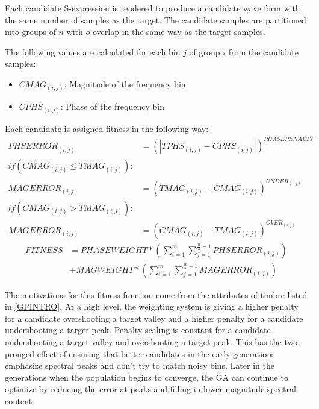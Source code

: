 \documentclass[12pt]{article}
\begin{document}
Each candidate S-expression is rendered to produce a candidate wave form with the same number of samples as the target. The candidate samples are partitioned into groups of $n$ with $o$ overlap in the same way as the target samples.

The following values are calculated for each bin $j$ of group $i$ from the candidate samples:
\begin{itemize}
\addtolength{\itemindent}{1cm}
\vspace{-3mm} 
\item $CMAG_{(i, j)}$: Magnitude of the frequency bin
\vspace{-3mm} 
\item $CPHS_{(i, j)}$: Phase of the frequency bin
\vspace{-2mm}
\end{itemize}

Each candidate is assigned fitness in the following way:
\vspace{-2mm} 
\begin{align*}
PHSERROR_{(i, j)} &= (|TPHS_{(i, j)} - CPHS_{(i, j)}|)^{PHASEPENALTY} \\
if (CMAG_{(i, j)} \le TMAG_{(i, j)}): \\
MAGERROR_{(i, j)} &= (TMAG_{(i, j)} - CMAG_{(i, j)})^{UNDER_{(i, j)}} \\
if (CMAG_{(i, j)} > TMAG_{(i, j)}): \\
MAGERROR_{(i, j)} &= (CMAG_{(i, j)} - TMAG_{(i, j)})^{OVER_{(i, j)}}
\end{align*}
\vspace{-8mm}
\begin{align*}
FITNESS &= PHASEWEIGHT * (\sum_{i=1}^{m} \sum_{j=1}^{\frac{n}{2} - 1} PHSERROR_{(i, j)}) \\
        &+ MAGWEIGHT * (\sum_{i=1}^{m} \sum_{j=1}^{\frac{n}{2} - 1} MAGERROR_{(i, j)})
\end{align*}
\vspace{-4mm}

The motivations for this fitness function come from the attributes of timbre listed in \ref{GPINTRO}. At a high level, the weighting system is giving a higher penalty for a candidate overshooting a target valley and a higher penalty for a candidate undershooting a target peak. Penalty scaling is constant for a candidate undershooting a target valley and overshooting a target peak. This has the two-pronged effect of ensuring that better candidates in the early generations emphasize spectral peaks and don't try to match noisy bins. Later in the generations when the population begins to converge, the GA can continue to optimize by reducing the error at peaks and filling in lower magnitude spectral content.
\end{document}
